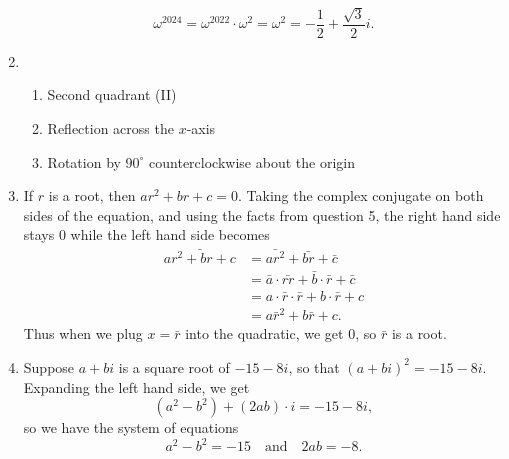 \begin{enumerate}
\begin{equation*}
\omega^{2024} = \omega^{2022}\cdot\omega^2 = \omega^2 = \boxed{-\frac{1}{2} + \frac{\sqrt{3}}{2}i}.
\end{equation*}
\item \begin{enumerate}
\item Second quadrant (II)
\item Reflection across the $x$-axis
\item Rotation by $90^{\circ}$ counterclockwise about the origin
\end{enumerate}
\item If $r$ is a root, then $ar^2 + br + c = 0$. Taking the complex conjugate on both sides of the equation, and using the facts from question 5, the right hand side stays $0$ while the left hand side becomes
\begin{align*}
\bar{ar^2 + br + c} &= \bar{ar^2} + \bar{br} + \bar{c} \\
&= \bar{a}\cdot\bar{rr} + \bar{b}\cdot\bar{r} + \bar{c} \\
&= a\cdot\bar{r}\cdot\bar{r} + b\cdot\bar{r} + c \tag{$a,b,c$ real} \\
&= a\bar{r}^2 + b\bar{r} + c.
\end{align*}
Thus when we plug $x = \bar{r}$ into the quadratic, we get $0$, so $\bar{r}$ is a root.
\item Suppose $a + bi$ is a square root of $-15 - 8i$, so that $(a + bi)^2 = -15 - 8i$. Expanding the left hand side, we get
\begin{equation*}
(a^2 - b^2) + (2ab)\cdot i = -15 - 8i,
\end{equation*}
so we have the system of equations
\begin{equation*}
a^2 - b^2 = -15\quad\text{and}\quad 2ab = -8.
\end{equation*}
\end{enumerate}